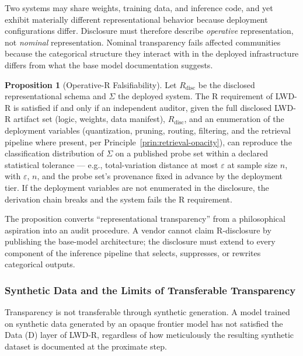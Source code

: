 \documentclass{article}
\theoremstyle{definition}
\newtheorem{proposition}{Proposition}[section]
\begin{document}
Two systems may share weights, training data, and inference code, and yet exhibit materially different representational behavior because deployment configurations differ. Disclosure must therefore describe \emph{operative} representation, not \emph{nominal} representation. Nominal transparency fails affected communities because the categorical structure they interact with in the deployed infrastructure differs from what the base model documentation suggests.

\begin{proposition}[Operative-R Falsifiability]
\label{prop:operative-r-test}
Let $R_{\mathrm{disc}}$ be the disclosed representational schema and $\Sigma$ the deployed system. The R requirement of LWD-R is satisfied if and only if an independent auditor, given the full disclosed LWD-R artifact set (logic, weights, data manifest), $R_{\mathrm{disc}}$, and an enumeration of the deployment variables (quantization, pruning, routing, filtering, and the retrieval pipeline where present, per Principle~\ref{prin:retrieval-opacity}), can reproduce the classification distribution of $\Sigma$ on a published probe set within a declared statistical tolerance --- e.g., total-variation distance at most $\varepsilon$ at sample size $n$, with $\varepsilon$, $n$, and the probe set's provenance fixed in advance by the deployment tier. If the deployment variables are not enumerated in the disclosure, the derivation chain breaks and the system fails the R requirement.
\end{proposition}

The proposition converts ``representational transparency'' from a philosophical aspiration into an audit procedure. A vendor cannot claim R-disclosure by publishing the base-model architecture; the disclosure must extend to every component of the inference pipeline that selects, suppresses, or rewrites categorical outputs.

\subsubsection{Synthetic Data and the Limits of Transferable Transparency}
\label{subsubsec:synthetic-d}

Transparency is not transferable through synthetic generation. A model trained on synthetic data generated by an opaque frontier model has not satisfied the Data (D) layer of LWD-R, regardless of how meticulously the resulting synthetic dataset is documented at the proximate step.
\end{document}
